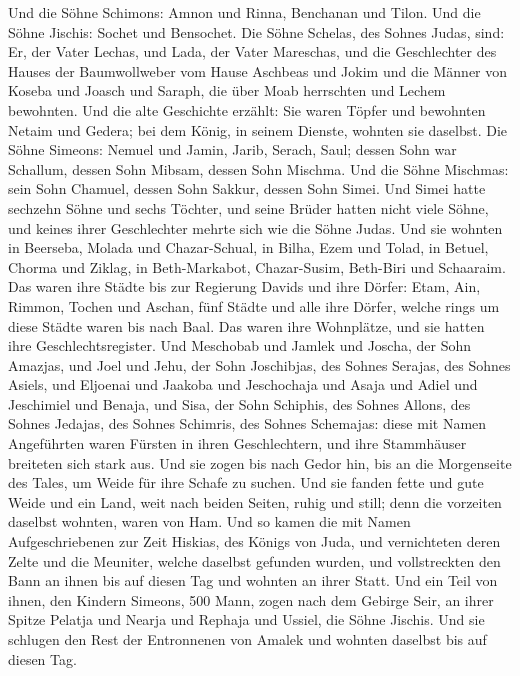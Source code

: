  Und die Söhne Schimons: Amnon und Rinna, Benchanan und
Tilon. Und die Söhne Jischis: Sochet und Bensochet.  Die
Söhne Schelas, des Sohnes Judas, sind: Er, der Vater Lechas, und Lada,
der Vater Mareschas, und die Geschlechter des Hauses der Baumwollweber
vom Hause Aschbeas  und Jokim und die Männer von Koseba
und Joasch und Saraph, die über Moab herrschten und Lechem bewohnten.
 Und die alte Geschichte erzählt: Sie waren Töpfer und
bewohnten Netaim und Gedera; bei dem König, in seinem Dienste, wohnten
sie daselbst.  Die Söhne Simeons: Nemuel und Jamin,
Jarib, Serach, Saul;  dessen Sohn war Schallum, dessen
Sohn Mibsam, dessen Sohn Mischma.  Und die Söhne
Mischmas: sein Sohn Chamuel, dessen Sohn Sakkur, dessen Sohn Simei.
 Und Simei hatte sechzehn Söhne und sechs Töchter, und
seine Brüder hatten nicht viele Söhne, und keines ihrer Geschlechter
mehrte sich wie die Söhne Judas.  Und sie wohnten in
Beerseba, Molada und Chazar-Schual,  in Bilha, Ezem und
Tolad,  in Betuel, Chorma und Ziklag,  in
Beth-Markabot, Chazar-Susim, Beth-Biri und Schaaraim. Das waren ihre
Städte bis zur Regierung Davids und ihre Dörfer:  Etam,
Ain, Rimmon, Tochen und Aschan, fünf Städte  und alle
ihre Dörfer, welche rings um diese Städte waren bis nach Baal. Das waren
ihre Wohnplätze, und sie hatten ihre Geschlechtsregister.
 Und Meschobab und Jamlek und Joscha, der Sohn Amazjas,
 und Joel und Jehu, der Sohn Joschibjas, des Sohnes
Serajas, des Sohnes Asiels,  und Eljoenai und Jaakoba und
Jeschochaja und Asaja und Adiel und Jeschimiel und Benaja,
 und Sisa, der Sohn Schiphis, des Sohnes Allons, des
Sohnes Jedajas, des Sohnes Schimris, des Sohnes Schemajas:
 diese mit Namen Angeführten waren Fürsten in ihren
Geschlechtern, und ihre Stammhäuser breiteten sich stark aus.
 Und sie zogen bis nach Gedor hin, bis an die Morgenseite
des Tales, um Weide für ihre Schafe zu suchen.  Und sie
fanden fette und gute Weide und ein Land, weit nach beiden Seiten, ruhig
und still; denn die vorzeiten daselbst wohnten, waren von Ham.
 Und so kamen die mit Namen Aufgeschriebenen zur Zeit
Hiskias, des Königs von Juda, und vernichteten deren Zelte und die
Meuniter, welche daselbst gefunden wurden, und vollstreckten den Bann an
ihnen bis auf diesen Tag und wohnten an ihrer Statt.  Und
ein Teil von ihnen, den Kindern Simeons, 500 Mann, zogen nach dem
Gebirge Seir, an ihrer Spitze Pelatja und Nearja und Rephaja und Ussiel,
die Söhne Jischis.  Und sie schlugen den Rest der
Entronnenen von Amalek und wohnten daselbst bis auf diesen Tag.

